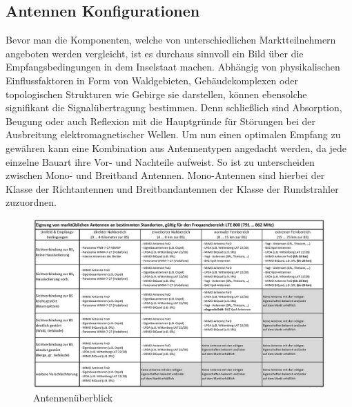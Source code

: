 	\subsection{Antennen Konfigurationen}
	\label{subsec:Antennen Konfigurationen}
Bevor man die Komponenten, welche von unterschiedlichen Marktteilnehmern angeboten werden vergleicht, ist es durchaus sinnvoll ein Bild über die Empfangsbedingungen in dem Inselstaat machen. Abhängig von physikalischen Einflussfaktoren in Form von Waldgebieten, Gebäudekomplexen oder topologischen Strukturen wie Gebirge sie darstellen, können ebensolche signifikant die Signalübertragung bestimmen. Denn schließlich sind Absorption, Beugung oder auch Reflexion mit die Hauptgründe für Störungen bei der Ausbreitung elektromagnetischer Wellen. Um nun einen optimalen Empfang zu gewähren kann eine Kombination aus Antennentypen angedacht werden, da jede einzelne Bauart ihre Vor- und Nachteile aufweist. So ist zu unterscheiden zwischen Mono- und Breitband Antennen. Mono-Antennen sind hierbei der Klasse der Richtantennen und Breitbandantennen der Klasse der Rundstrahler zuzuordnen. \cite{Sch19}
\begin{figure}[ht]
	\centering
	\includegraphics[width=1\linewidth]{images/tabellemcnantennen}
	\caption{Antennenüberblick  \protect\cite{Sch19}}
	\label{fig:tabellemcnantennen}
\end{figure}

\raggedbottom 
